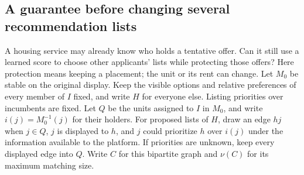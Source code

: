\subsection{A guarantee before changing several recommendation lists}
A housing service may already know who holds a tentative offer. Can it still use
a learned score to choose other applicants' lists while protecting those offers?
Here protection means keeping a placement; the unit or its rent can change.
Let $M_0$ be stable on the original display. Keep the visible options and
relative preferences of every member of $I$ fixed, and write $H$ for everyone
else. Listing priorities over incumbents are fixed. Let $Q$ be the units
assigned to $I$ in $M_0$, and write $i(j)=M_0^{-1}(j)$ for their holders.
For proposed lists of $H$, draw an edge $hj$ when $j\in Q$, $j$ is displayed
to $h$, and $j$ could prioritize $h$ over $i(j)$ under the information available
to the platform. If priorities are unknown, keep every displayed edge into $Q$.
Write $C$ for this bipartite graph and $\nu(C)$ for its maximum matching size.


